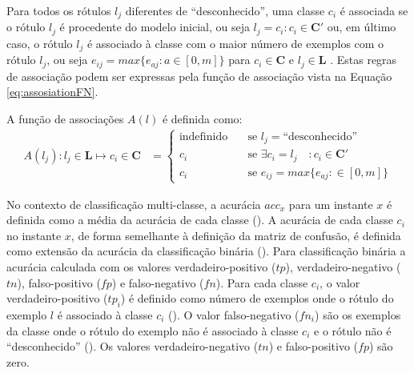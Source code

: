 Para todos os rótulos $l_j$ diferentes de ``desconhecido'', uma classe $c_i$ é
associada se o rótulo $l_j$ é procedente do modelo inicial, ou seja $l_j = c_i :
c_i \in \mathbf{C}'$ ou, em último caso, o rótulo $l_j$ é associado à classe com
o maior número de exemplos com o rótulo $l_j$, ou seja $e_{ij} = max\{ e_{aj} :
a \in [0, m] \}$ para $c_i \in \mathbf{C}$ e $l_j \in \mathbf{L}$
\cite{Faria2013evaluation}.
Estas regras de associação podem ser expressas pela função de associação vista
na Equação \ref{eq:assosiationFN}.

\begin{definition}
  A função de associações $A(l)$ é definida como:
  \begin{align}
    A(l_j) : l_j \in \mathbf{L} \mapsto c_i \in \mathbf{C} &= \begin{cases} 
      \text{indefinido}        & \quad \text{se } l_j = \text{``desconhecido''} \\
      c_i         & \quad \text{se } \exists c_i = l_j \quad: c_i \in \mathbf{C}' \\
      c_i         & \quad \text{se } e_{ij} = max\{ e_{aj} : \in [0, m] \}
    \end{cases}
    \label{eq:assosiationFN}
  \end{align}
\end{definition}

No contexto de classificação multi-classe, a acurácia $\mathit{acc}_x$ para um
instante $x$ é definida como a média da acurácia de cada classe ().
A acurácia de cada classe $c_i$ no instante $x$, de forma semelhante à
definição da matriz de confusão, é definida como extensão da acurácia da
classificação binária ().
Para classificação binária a acurácia calculada com os valores
verdadeiro-positivo ($tp$), verdadeiro-negativo ($tn$), falso-positivo ($fp$) e
falso-negativo ($fn$).
Para cada classe $c_i$, o valor verdadeiro-positivo ($tp_i$) é definido como
número de exemplos onde o rótulo do exemplo $l$ é associado à
classe $c_i$ ().
O valor falso-negativo ($fn_i$) são os exemplos da classe onde o
rótulo do exemplo não é associado à classe $c_i$ e o rótulo não é ``desconhecido'' ().
Os valores verdadeiro-negativo ($tn$) e falso-positivo ($fp$) são zero.

